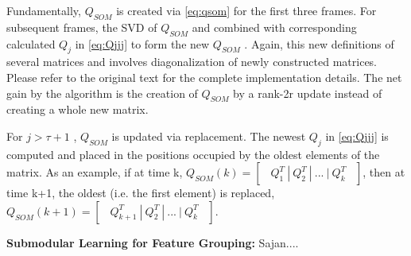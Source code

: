\documentclass[10pt,twocolumn,letterpaper]{article}
\begin{document}
Fundamentally, $Q_{SOM}$ is created via \eqref{eq:qsom} 
for the first three frames. For subsequent frames, the SVD of $Q_{SOM}$ and combined with corresponding calculated ${Q}_{j}$ in \eqref{eq:Qjjj} to form the new $Q_{SOM}$ . Again, this new definitions of several matrices and involves diagonalization of newly constructed matrices. Please refer to the original text for the complete implementation details. The net gain by the algorithm is the creation of $Q_{SOM}$ by a rank-2r update instead of creating a whole new matrix. 

For $j>\tau + 1$ , $Q_{SOM}$ is updated via replacement. The newest ${Q}_{j}$ in \eqref{eq:Qjjj} is computed and placed in the positions occupied by the oldest elements of the matrix. As an example, if at time k, $Q_{SOM}(k) = \begin{bmatrix} \ \ Q_1^T \ | \ Q_2^T \ | \ ... \ | \ Q_k^T  \ \ \end{bmatrix}$, then at time k+1, the oldest (i.e. the first element) is replaced, ${Q}_{SOM}(k+1) = \begin{bmatrix}\ \ Q_{k+1}^T \ | \ Q_2^T \ | \ ... \ | \ Q_k^T\ \ \end{bmatrix}$.

\textbf{Submodular Learning for Feature Grouping:} Sajan....
\end{document}
